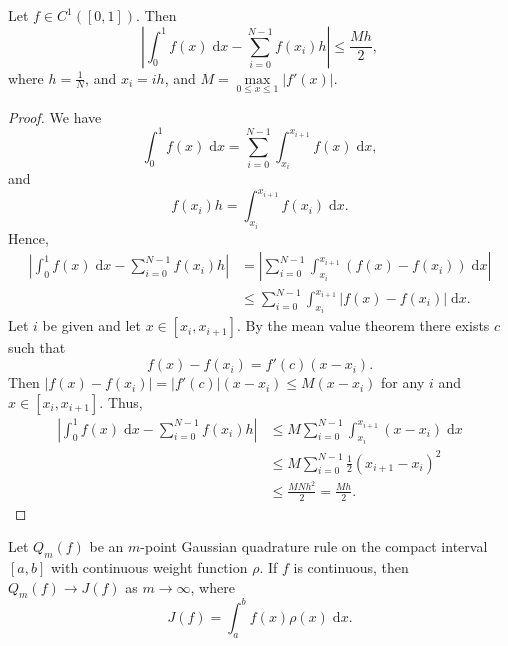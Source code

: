 \documentclass{homework}
\begin{document}
	\maketitle
	
	\question
	Let $f \in C^1([0,1])$. Then
	\begin{equation}
		\label{eq:p1_goal}
		\left|\int_0^1 f(x)\;\text{d} x - \sum_{i=0}^{N-1}f(x_i)h\right| \le \frac{Mh}{2},
	\end{equation}
	where $h = \frac{1}{N}$, and $x_i = ih$, and $M = \max\limits_{0\le x\le 1}|f'(x)|$.
	\begin{proof}
	We have
	\begin{equation*}
		\int_0^1f(x)\;\text{d}x = \sum_{i=0}^{N-1}\int_{x_i}^{x_{i+1}} f(x)\;\text{d}x,
	\end{equation*}
	and
	\begin{equation*}
		f(x_i)h = \int_{x_i}^{x_{i+1}}f(x_i)\;\text{d}x.
	\end{equation*}
	Hence,
	\begin{align*}
		\left|\int_0^1 f(x)\;\text{d} x - \sum_{i=0}^{N-1}f(x_i)h\right| &= \left|\sum_{i=0}^{N-1} \int_{x_i}^{x_{i+1}}(f(x) - f(x_i))\;\text{d}x\right| \\
		& \le \sum_{i=0}^{N-1}\int_{x_i}^{x_{i+1}}|f(x) - f(x_i)|\;\text{d}x.
	\end{align*}
	Let $i$ be given and let $x \in [x_i, x_{i+1}]$. By the mean value theorem there exists $c$ such that
	\begin{equation*}
		f(x) - f(x_i) = f'(c)(x-x_i).
	\end{equation*}
	 Then $|f(x) - f(x_i)| = |f'(c)|(x-x_i) \le M(x-x_i)$ for any $i$ and $x \in [x_i, x_{i+1}]$. Thus,
	\begin{align*}
		\left|\int_0^1 f(x)\;\text{d} x - \sum_{i=0}^{N-1}f(x_i)h\right| &\le M\sum_{i=0}^{N-1}\int_{x_i}^{x_{i+1}} (x-x_i)\;\text{d}x \\
		& \le M\sum_{i=0}^{N-1}\frac{1}{2}(x_{i+1} -x_i)^2 \\
		& \le \frac{MNh^2}{2} = \frac{Mh}{2}.
	\end{align*}
	\end{proof}
	
	\question Let $Q_m(f)$ be an $m$-point Gaussian quadrature rule on the compact interval $[a,b]$ with continuous weight function $\rho$. If $f$ is continuous, then $Q_m(f) \to J(f)$ as $m \to \infty$, where
	\begin{equation*}
		J(f) = \int_a^bf(x)\rho(x)\;\text{d}x.
	\end{equation*}
	
\end{document}
